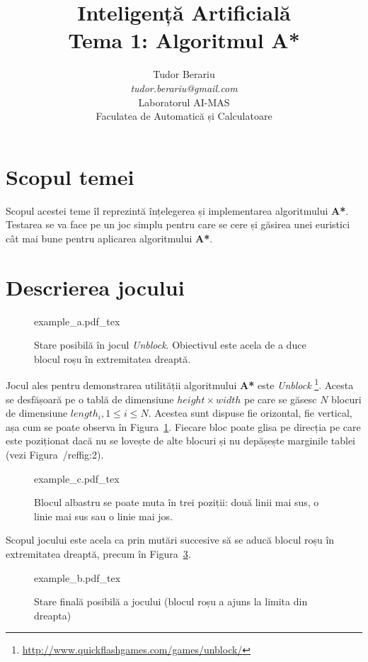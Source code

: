 \documentclass[12pt]{article}
\author{Tudor Berariu \\ \emph{tudor.berariu@gmail.com} \\ Laboratorul
  AI-MAS \\ Faculatea de Automatică și Calculatoare}
\title{Inteligență Artificială \\ Tema 1: \textbf{Algoritmul A*}}
\begin{document}
\maketitle

\section{Scopul temei}
\label{sec:scop}

Scopul acestei teme îl reprezintă înțelegerea și implementarea
algoritmului \textbf{A*}. Testarea se va face pe un joc simplu pentru
care se cere și găsirea unei euristici cât mai bune pentru aplicarea
algoritmului \textbf{A*}.

\section{Descrierea jocului}
\label{sec:descriere}

\begin{figure}[h!]
  \centering {}{example_a.pdf_tex}
  \caption{Stare posibilă în jocul \emph{Unblock}. Obiectivul este
    acela de a duce blocul roșu în extremitatea dreaptă.}
  \label{fig:1}
\end{figure}

Jocul ales pentru demonstrarea utilității algoritmului \textbf{A*}
este \emph{Unblock} \footnote{
  \url{http://www.quickflashgames.com/games/unblock/}}. Acesta se
desfășoară pe o tablă de dimensiune $height \times width$ pe care se
găsesc $N$ blocuri de dimensiune $length_i, 1 \le i \le N$. Acestea
sunt dispuse fie orizontal, fie vertical, așa cum se poate observa în
Figura~\ref{fig:1}. Fiecare bloc poate glisa pe direcția pe care este
poziționat dacă nu se lovește de alte blocuri și nu depășește
marginile tablei (vezi Figura~/ref{fig:2}).

\begin{figure}[h!]
  \centering {}{example_c.pdf_tex}
  \caption{Blocul albastru se poate muta în trei poziții: două linii
    mai sus, o linie mai sus sau o linie mai jos.}
  \label{fig:2}
\end{figure}

Scopul jocului este acela ca prin mutări succesive să se aducă blocul
roșu în extremitatea dreaptă, precum în Figura~\ref{fig:3}.

\begin{figure}[h!]
  \centering {}{example_b.pdf_tex}
  \caption{Stare finală posibilă a jocului (blocul roșu a ajuns la
    limita din dreapta)}
  \label{fig:3}
\end{figure}
\end{document}
